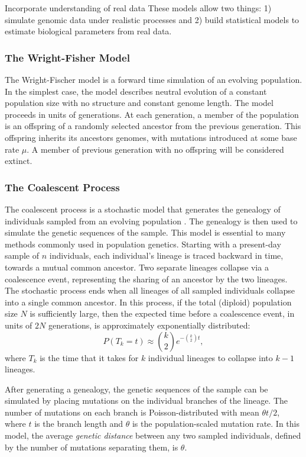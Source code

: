 Incorporate understanding of real data
These models allow two things: 1) simulate genomic data under realistic processes and 2) build statistical models to estimate biological parameters from real data.

\subsubsection{The Wright-Fisher Model}

The Wright-Fischer model is a forward time simulation of an evolving population.
In the simplest case, the model describes neutral evolution of a constant population size with no structure and constant genome length.
The model proceeds in units of generations.
At each generation, a member of the population is an offspring of a randomly selected ancestor from the previous generation.
This offspring inherits its ancestors genomes, with mutations introduced at some base rate $\mu$.
A member of previous generation with no offspring will be considered extinct.

\subsubsection{The Coalescent Process}

The coalescent process is a stochastic model that generates the genealogy of individuals sampled from an evolving population \cite{Wakeley:2009}.
The genealogy is then used to simulate the genetic sequences of the sample.
This model is essential to many methods commonly used in population genetics.
Starting with a present-day sample of $n$ individuals, each individual's lineage is traced backward in time, towards a mutual common ancestor.
Two separate lineages collapse via a coalescence event, representing the sharing of an ancestor by the two lineages.
The stochastic process ends when all lineages of all sampled individuals collapse into a single common ancestor.
In this process, if the total (diploid) population size $N$ is sufficiently large, then the expected time before a coalescence event, in units of $2N$ generations, is approximately exponentially distributed:
\begin{equation}
P(T_{k}=t) \approx \binom{k}{2} e^{-\binom{k}{2} t},
\end{equation}
where $T_k$ is the time that it takes for $k$ individual lineages to collapse into $k-1$ lineages.

After generating a genealogy, the genetic sequences of the sample can be simulated by placing mutations on the individual branches of the lineage.
The number of mutations on each branch is Poisson-distributed with mean $\theta t / 2$, where $t$ is the branch length and $\theta$ is the population-scaled mutation rate.
In this model, the average \emph{genetic distance} between any two sampled individuals, defined by the number of mutations separating them, is $\theta$.

